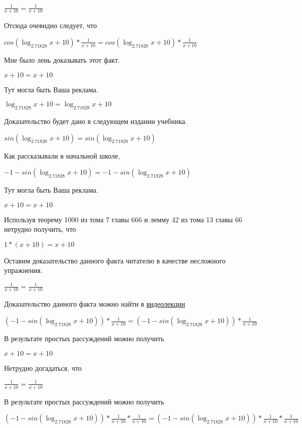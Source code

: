 \documentclass[12pt,a4paper,fleqn]{article}
\theoremstyle{definition}
\begin{document}
$\frac{ 1 }{ x  +  10 }
 = \frac{ 1 }{ x  +  10 }
$

Отсюда очевидно следует, что 

$cos(\log_{ 2.71828 }{ x  +  10 }) * \frac{ 1 }{ x  +  10 }
 = cos(\log_{ 2.71828 }{ x  +  10 }) * \frac{ 1 }{ x  +  10 }
$

Мне было лень доказывать этот факт.

$ x  +  10  =  x  +  10 $

Тут могла быть Ваша реклама. 

$\log_{ 2.71828 }{ x  +  10 } = \log_{ 2.71828 }{ x  +  10 }$

Доказательство будет дано в следующем издании учебника. 

$sin(\log_{ 2.71828 }{ x  +  10 }) = sin(\log_{ 2.71828 }{ x  +  10 })$

Как рассказывали в начальной школе, 

$ -1  - sin(\log_{ 2.71828 }{ x  +  10 }) =  -1  - sin(\log_{ 2.71828 }{ x  +  10 })$

Тут могла быть Ваша реклама. 

$ x  +  10  =  x  +  10 $

Используя теорему 1000 из тома 7 главы 666 и лемму 42 из тома 13 главы 66 нетрудно получить, что 

$ 1  * ( x  +  10 ) =  x  +  10 $

Оставим доказательство данного факта читателю в качестве несложного упражнения. 

$\frac{ 1 }{ x  +  10 }
 = \frac{ 1 }{ x  +  10 }
$

Доказательство данного факта можно найти в \href{https://www.youtube.com/watch?v=dQw4w9WgXcQ}{видеолекции} 

$( -1  - sin(\log_{ 2.71828 }{ x  +  10 })) * \frac{ 1 }{ x  +  10 }
 = ( -1  - sin(\log_{ 2.71828 }{ x  +  10 })) * \frac{ 1 }{ x  +  10 }
$

В результате простых рассуждений можно получить 

$ x  +  10  =  x  +  10 $

Нетрудно догадаться, что 

$\frac{ 1 }{ x  +  10 }
 = \frac{ 1 }{ x  +  10 }
$

В результате простых рассуждений можно получить 

$( -1  - sin(\log_{ 2.71828 }{ x  +  10 })) * \frac{ 1 }{ x  +  10 }
 * \frac{ 1 }{ x  +  10 }
 = ( -1  - sin(\log_{ 2.71828 }{ x  +  10 })) * \frac{ 1 }{ x  +  10 }
 * \frac{ 1 }{ x  +  10 }
$
\end{document}
